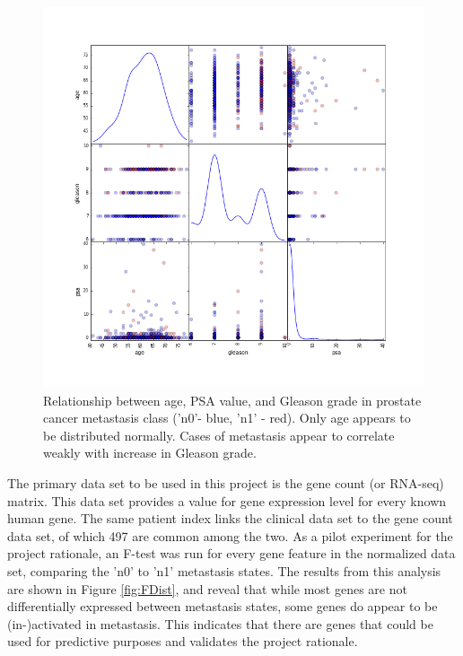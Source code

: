 \documentclass[final]{article}
\begin{document}
\begin{figure}[h!]
  \centering
  \includegraphics[scale=0.33]{ClinScatterMatrix}
  \caption{Relationship between age, PSA value, and Gleason grade in prostate cancer
  metastasis class ('n0'- blue, 'n1' - red).\label{fig:ClinSM}  Only age appears to
  be distributed normally.  Cases of metastasis appear to correlate weakly with
  increase in Gleason grade.}
\end{figure}

The primary data set to be used in this project is the gene count (or RNA-seq)
matrix.  This data set provides a value for gene expression level for every
known human gene. The same patient index links the clinical data set to the
gene count data set, of which 497 are common among the two.  As a pilot
experiment for the project rationale, an F-test was run for every gene feature
in the normalized data set, comparing the 'n0' to 'n1' metastasis states.  The
results from this analysis are  shown in Figure \ref{fig:FDist}, and reveal that
while most genes are not differentially expressed between metastasis states,
some genes do appear to be (in-)activated in metastasis. This indicates that there
are genes that could be used for predictive purposes and validates the project
rationale.
\end{document}

